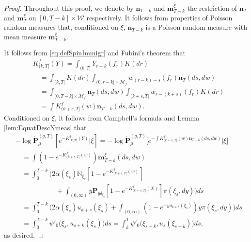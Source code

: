 \documentclass[UTF8]{pkuthss}
\theoremstyle{plain}
\theoremstyle{definition}
\numberwithin{equation}{section}
\begin{document}
\begin{proof}
	Throughout this proof,
we denote by $\mathbf n_{T-k}$ and $\mathbf m^\xi_{T-k}$
	the restriction of $\mathbf n_T$ and $\mathbf m^\xi_T$ on $[0,T-k] \times \mathcal W$ respectively.
	It follows from  properties of Poisson random measures that, conditioned on $\xi$, $\mathbf n_{T-k}$ is a Poisson random measure with mean measure $\mathbf m^\xi_{T-k}$.
\par
	It follows from \eqref{eq:defSpinImmigr} and Fubini's theorem that
\begin{equation}\label{eq:kfy_is_nkf}\begin{split}
    &K_{(k,T]}^f(Y)
    = \int_{(k,T]} Y_{r-k}(f_r) K(dr) \\
	&\quad = \int_{(k,T]} K(dr) \int_{(0,r-k] \times \mathcal M_f} w_{(r-k)-s}(f_r) \mathbf n_T(ds,dw)\\
	&\quad = \int_{(0,T-k] \times \mathcal M_f} \mathbf n_T(ds,dw) \int_{(k+s,T]} w_{r-(k+s)}(f_r) K(dr)\\
    &\quad = \int K^f_{(k + s, T]}(w)\mathbf n_{T-k}(ds,dw).
\end{split}\end{equation}
	Conditioned on $\xi$, it follows from Campbell's formula and Lemma \ref{lem:EquatDescNmeas} that
\[\begin{split}
    &-\log \dot{\mathbf P}^{(g,T)}_\mu[e^{-K^f_{(k, T]}(Y)}|\xi]
    = -\log \dot{\mathbf P}^{(g,T)}_\mu\big[e^{-\int K^f_{(k + s, T]}(w)\mathbf n_{T-k}(ds,dw)}\big|\xi\big]\\
	&\quad = \int(1 - e^{-K_{(k + s, T]}^f (w)})\mathbf m^\xi_{T-k}(ds,dw)\\
	&\quad = \int_0^{T-k} \Big(2\alpha(\xi_s) \mathbb N_{\xi_s}[1 - e^{-K_{(k + s, T]}^f(w)}] \\
	&\qquad\qquad\qquad + \int_{(0,\infty)} y \mathbf P_{y \delta_{\xi_s}}[1 - e^{-K_{(k + s, T]}^f(X)}] \pi(\xi_s,dy)\Big) ds\\
	&\quad = \int_0^{T-k} \Big(2\alpha(\xi_s) u_{k+s}(\xi_s) + \int_{(0,\infty)} (1 - e^{-yu_{k+s}(\xi_s)})y\pi(\xi_s,dy)\Big) ds
	\\&\quad =\int_0^{T-k} \psi'_0\big(\xi_s,u_{s+k}(\xi_s)\big) ds
	=\int_k^T \psi'_0\big(\xi_{s-k},u_s(\xi_{s-k})\big) ds,
\end{split}\]
	as desired.
\end{proof}
\end{document}

